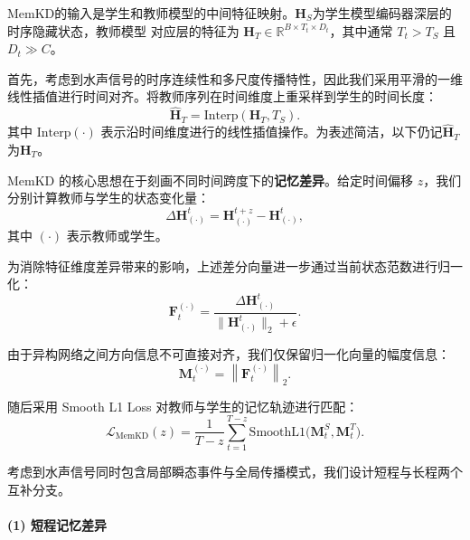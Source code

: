 \documentclass[a4paper, 12pt]{article}
\begin{document}
MemKD的输入是学生和教师模型的中间特征映射。$\mathbf{H}_S$为学生模型编码器深层的时序隐藏状态，教师模型
对应层的特征为 $  \mathbf{H}_T \in \mathbb{R}^{B \times T_t \times D_t}  $，其中通常 $  T_t > T_S  $ 且 $D_t \gg C$。

首先，考虑到水声信号的时序连续性和多尺度传播特性，因此我们采用平滑的一维线性插值进行时间对齐。将教师序列在时间维度上重采样到学生的时间长度：
\begin{equation}
\hat{\mathbf{H}}_T = \text{Interp}(\mathbf{H}_{T}, T_S).
\end{equation}
其中 $\text{Interp}(\cdot)$ 表示沿时间维度进行的线性插值操作。为表述简洁，以下仍记$\hat{\mathbf{H}}_T$为$\mathbf{H}_T$。

MemKD 的核心思想在于刻画不同时间跨度下的\textbf{记忆差异}。给定时间偏移 $z$，我们分别计算教师与学生的状态变化量：
\begin{equation}
\Delta \mathbf{H}^t_{(\cdot)}
= \mathbf{H}^{t+z}_{(\cdot)} - \mathbf{H}^{t}_{(\cdot)},
\end{equation}
其中 $(\cdot)$ 表示教师或学生。

为消除特征维度差异带来的影响，上述差分向量进一步通过当前状态范数进行归一化：
\begin{equation}
\mathbf{F}^{(\cdot)}_t
= \frac{\Delta \mathbf{H}^t_{(\cdot)}}
{\|\mathbf{H}^t_{(\cdot)}\|_2 + \epsilon}.
\end{equation}

由于异构网络之间方向信息不可直接对齐，我们仅保留归一化向量的幅度信息：
\begin{equation}
\mathbf{M}^{(\cdot)}_t
= \left\|
\mathbf{F}^{(\cdot)}_t
\right\|_2.
\end{equation}

随后采用 Smooth L1 Loss 对教师与学生的记忆轨迹进行匹配：
\begin{equation}
\mathcal{L}_{\text{MemKD}}(z)
=
\frac{1}{T-z}
\sum_{t=1}^{T-z}
\mathrm{SmoothL1}
\Big(
\mathbf{M}^{S}_t,
\mathbf{M}^{T}_t
\Big).
\end{equation}

考虑到水声信号同时包含局部瞬态事件与全局传播模式，我们设计短程与长程两个互补分支。

\paragraph{(1) 短程记忆差异}
\end{document}
